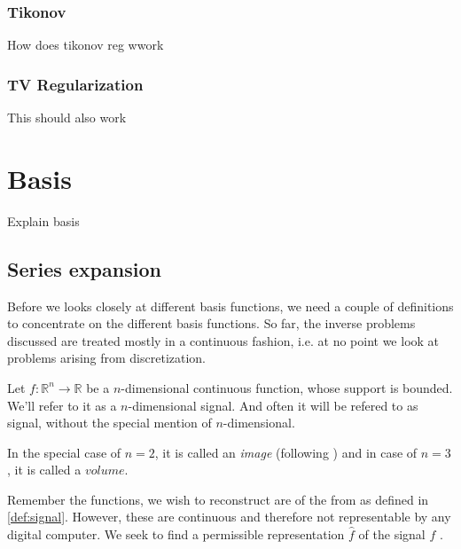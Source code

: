 \subsection{Tikonov}

How does tikonov reg wwork

\subsection{TV Regularization}

This should also work

\chapter{Basis}

Explain basis

\section{Series expansion}

Before we looks closely at different basis functions, we need a couple of definitions to concentrate
on the different basis functions. So far, the inverse problems discussed are treated mostly in a
continuous fashion, i.e. at no point we look at problems arising from discretization.

\begin{definition}[Signal]
    \label{def:signal}
    Let $f: \mathbb{R}^n \to \mathbb{R}$ be a $n$-dimensional continuous function, whose support is 
    bounded. We'll refer to it as a $n$-dimensional signal. And often it will be refered to as signal, 
    without the special mention of $n$-dimensional.

    In the special case of $n=2$, it is called an \textit{image} (following \cite{herman_basis_2015})
    and in case of $n=3$, it is called a $volume$.
\end{definition}

Remember the functions, we wish to reconstruct are of the from as defined in \ref{def:signal}.
However, these are continuous and therefore not representable by any digital computer.
We seek to find a permissible representation $\hat{f}$ of the signal $f$ \cite{herman_basis_2015}.

